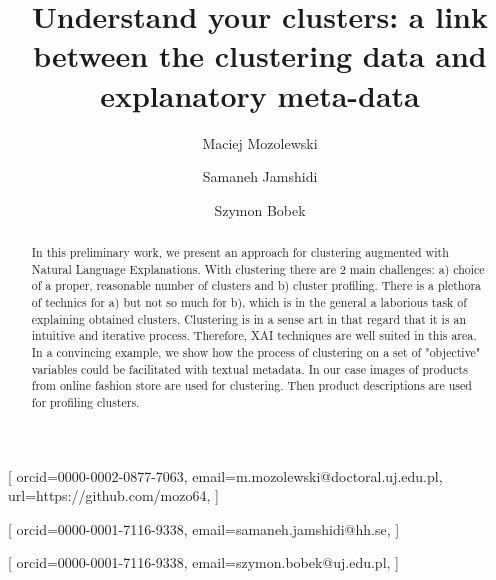 \documentclass[
 twocolumn,
]{ceurart}
\begin{document}


\title{Understand your clusters: a link between the clustering data and explanatory meta-data}

\tnotemark[1]

\author[1]{Maciej Mozolewski}[%
orcid=0000-0002-0877-7063,
email=m.mozolewski@doctoral.uj.edu.pl,
url=https://github.com/mozo64,
]
\cormark[1]
\fnmark[1]
\address[1]{Jagiellonian University,
  Cracow, Poland}

\author[2]{Samaneh Jamshidi}[%
  orcid=0000-0001-7116-9338,
  email=samaneh.jamshidi@hh.se,
]
\fnmark[1]
\address[2]{Center for Applied Intelligent Systems Research (CAISR), Halmstad University, Halmstad, Sweden}

\author[1]{Szymon Bobek}[%
orcid=0000-0001-7116-9338,
email=szymon.bobek@uj.edu.pl,
]
\fnmark[1]


\begin{abstract}
  In this preliminary work, we present an approach for clustering augmented with Natural Language Explanations.
  With clustering there are 2 main challenges: a) choice of a proper, reasonable number of clusters and b) cluster profiling.
  There is a plethora of technics for a) but not so much for b), which is in the general a laborious task of explaining obtained clusters.
  Clustering is in a sense art in that regard that it is an intuitive and iterative process.
  Therefore, XAI techniques are well suited in this area.
  In a convincing example, we show how the process of clustering on a set of "objective" variables could be facilitated with textual metadata.
  In our case images of products from online fashion store are used for clustering.
  Then product descriptions are used for profiling clusters.
\end{abstract}
\end{document}
